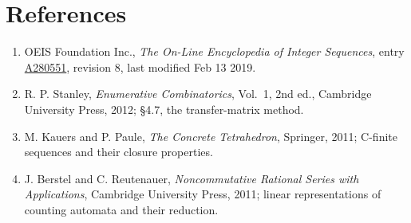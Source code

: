 \documentclass[11pt]{article}
\theoremstyle{definition}
\begin{document}
\section{References}

\begin{enumerate}

\item OEIS Foundation Inc., \emph{The On-Line Encyclopedia of Integer Sequences}, entry \href{https://oeis.org/A280551}{A280551}, revision 8, last modified Feb 13 2019.

\item R. P. Stanley, \emph{Enumerative Combinatorics}, Vol.~1, 2nd ed., Cambridge University Press, 2012; \S4.7, the transfer-matrix method.

\item M. Kauers and P. Paule, \emph{The Concrete Tetrahedron}, Springer, 2011; C-finite sequences and their closure properties.

\item J. Berstel and C. Reutenauer, \emph{Noncommutative Rational Series with Applications}, Cambridge University Press, 2011; linear representations of counting automata and their reduction.

\end{enumerate}
\end{document}
